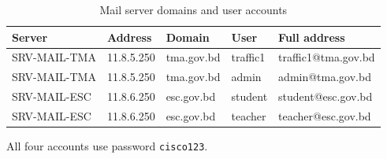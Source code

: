 \documentclass[11pt,a4paper]{article}
\newcommand{\netc}[1]{\texttt{\small #1}}
\begin{document}
\begin{table}[htbp]
\centering
\caption{Mail server domains and user accounts}
\label{tab:mail}
\small
\begin{tabular}{@{}lllll@{}}
\toprule
\textbf{Server} & \textbf{Address} & \textbf{Domain} & \textbf{User} &
\textbf{Full address} \\
\midrule
SRV-MAIL-TMA & 11.8.5.250 & tma.gov.bd & traffic1 & traffic1@tma.gov.bd \\
SRV-MAIL-TMA & 11.8.5.250 & tma.gov.bd & admin    & admin@tma.gov.bd \\
SRV-MAIL-ESC & 11.8.6.250 & esc.gov.bd & student  & student@esc.gov.bd \\
SRV-MAIL-ESC & 11.8.6.250 & esc.gov.bd & teacher  & teacher@esc.gov.bd \\
\bottomrule
\end{tabular}
\end{table}

\noindent
All four accounts use password \netc{cisco123}. 

\clearpage
\end{document}
